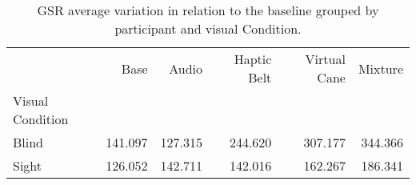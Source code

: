
\begin{table}[!htb]
\centering
\caption{GSR average variation in relation to the baseline grouped by participant and visual Condition.}
\label{tab:gsr_var_average_group}
\begin{tabular}{lrrrrr}
\toprule
{} &    Base &   Audio &  Haptic Belt &  Virtual Cane &  Mixture \\
Visual Condition &         &         &              &               &          \\
\midrule
Blind            & 141.097 & 127.315 &      244.620 &       307.177 &  344.366 \\
Sight            & 126.052 & 142.711 &      142.016 &       162.267 &  186.341 \\
\bottomrule
\end{tabular}
\end{table}

